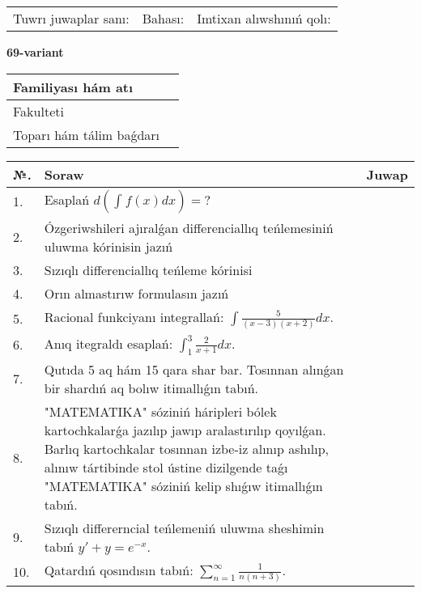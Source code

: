 \documentclass{article}
\begin{document}
\vspace{1cm}

\begin{tabular}{ c c c }
Tuwrı juwaplar sanı: \underline{\hspace{2cm}} & Bahası: \underline{\hspace{2cm}} & Imtixan alıwshınıń qolı: \underline{\hspace{2cm}} \\
\end{tabular}

\newpage

\begin{center}\textbf{69-variant}\end{center}

\bgroup
\def\arraystretch{1.5}
\begin{tabular}{ |m{6cm}|m{10cm}| }
  \hline
  Familiyası hám atı & \\
  \hline
  Fakulteti &\\
  \hline
  Toparı hám tálim baǵdarı & \\
  \hline
\end{tabular}
\egroup

\vspace{0.5cm}

\bgroup
\def\arraystretch{2}
\begin{tabular}{ |l|m{8cm}|m{7cm}| }
  \hline
  №. & Soraw & Juwap \\
  \hline
  1. & Esaplań $\displaystyle d\left( \int_{}^{}{f(x)dx} \right) = ?$ &  \\
  \hline
  2. & Ózgeriwshileri ajıralǵan differenciallıq teńlemesiniń uluwma kórinisin jazıń &  \\
  \hline
  3. & Sızıqlı differenciallıq teńleme kórinisi &  \\
  \hline
  4. & Orın almastırıw formulasın jazıń &  \\
  \hline
  5. & Racional funkciyanı integrallań: $\displaystyle\int {\frac{5}{(x - 3)(x + 2)}dx}$. &  \\
  \hline
  6. & Anıq itegraldı esaplań: $\displaystyle\int_{1}^{3}{\frac{2}{x + 1}dx}$. &  \\
  \hline
  7. & Qutıda 5 aq hám 15 qara shar bar. Tosınnan alınǵan bir shardıń aq bolıw itimallıǵın tabıń. &  \\
  \hline
  8. & "MATEMATIKA" sóziniń háripleri bólek kartochkalarǵa jazılıp jawıp aralastırılıp qoyılǵan. Barlıq kartochkalar tosınnan izbe-iz alınıp ashılıp, alınıw tártibinde stol ústine dizilgende taǵı "MATEMATIKA" sóziniń kelip shıǵıw itimallıǵın tabıń. &  \\
  \hline
  9. & Sızıqlı differerncial teńlemeniń uluwma sheshimin tabıń $y' + y =e^{-x}$. &  \\
  \hline
  10. & Qatardıń qosındısın tabıń: $\displaystyle\sum_{n = 1}^{\infty}\frac{1}{n(n + 3)}$. &  \\
  \hline
\end{tabular}
\egroup
\end{document}
